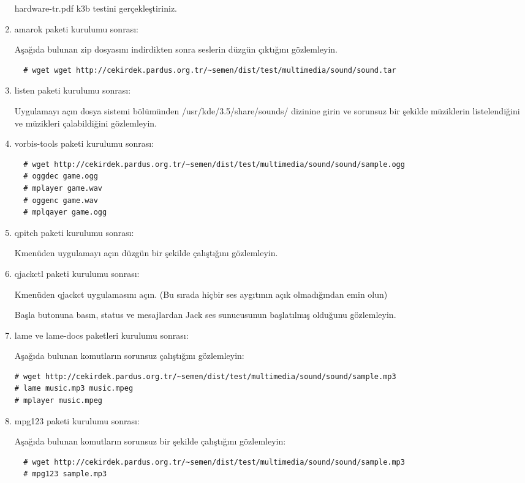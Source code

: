 \documentclass[a4paper,10pt]{article}
\begin{document}
\begin{enumerate}
hardware-tr.pdf k3b testini gerçekleştiriniz.
\item amarok paketi kurulumu sonrası:
 
Aşağıda bulunan zip dosyasını indirdikten sonra seslerin düzgün çıktığını gözlemleyin.
 \begin{verbatim}
  # wget wget http://cekirdek.pardus.org.tr/~semen/dist/test/multimedia/sound/sound.tar
 \end{verbatim}	

\item listen paketi kurulumu sonrası: 

Uygulamayı açın dosya sistemi bölümünden /usr/kde/3.5/share/sounds/ dizinine girin ve sorunsuz bir şekilde müziklerin listelendiğini ve müzikleri çalabildiğini gözlemleyin.

\item vorbis-tools paketi kurulumu sonrası: 
 \begin{verbatim}
  # wget http://cekirdek.pardus.org.tr/~semen/dist/test/multimedia/sound/sound/sample.ogg
  # oggdec game.ogg
  # mplayer game.wav
  # oggenc game.wav
  # mplqayer game.ogg
 \end{verbatim}

\item qpitch paketi kurulumu sonrası:

Kmenüden uygulamayı açın düzgün bir şekilde çalıştığını gözlemleyin.

\item qjackctl paketi kurulumu sonrası: 

Kmenüden qjackct uygulamasını açın. (Bu sırada hiçbir ses aygıtının açık olmadığından emin olun)

Başla butonuna basın, status ve mesajlardan Jack ses sunucusunun başlatılmış olduğunu gözlemleyin.

\item lame ve lame-docs paketleri kurulumu sonrası: 

Aşağıda bulunan komutların sorunsuz çalıştığını gözlemleyin:
\begin{verbatim}
# wget http://cekirdek.pardus.org.tr/~semen/dist/test/multimedia/sound/sound/sample.mp3
# lame music.mp3 music.mpeg
# mplayer music.mpeg
\end{verbatim}

\item mpg123 paketi kurulumu sonrası:

Aşağıda bulunan komutların sorunsuz bir şekilde çalıştığını gözlemleyin:
 \begin{verbatim}
  # wget http://cekirdek.pardus.org.tr/~semen/dist/test/multimedia/sound/sound/sample.mp3
  # mpg123 sample.mp3
 \end{verbatim}

\end{enumerate}
\end{document}
